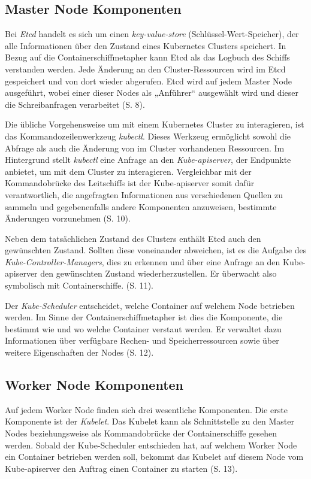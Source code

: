 \documentclass[11pt,a4paper]{article}
\begin{document}
\subsection{Master Node Komponenten}
\label{sec:MasterNodeKomponenten}
Bei \emph{Etcd} handelt es sich um einen \emph{key-value-store} (Schlüssel-Wert-Speicher),
der alle Informationen über den Zustand eines Kubernetes Clusters speichert.
In Bezug auf die Containerschiffmetapher kann Etcd als das Logbuch des Schiffs verstanden werden.
Jede Änderung an den Cluster-Ressourcen wird im Etcd gespeichert und von dort wieder abgerufen.
Etcd wird auf jedem Master Node ausgeführt, wobei einer dieser Nodes als „Anführer“
ausgewählt wird und dieser die Schreibanfragen verarbeitet \cite{Schmeling_Dargatz_2022} (S. 8).

Die übliche Vorgehensweise um mit einem Kubernetes Cluster zu interagieren, ist das Kommandozeilenwerkzeug \emph{kubectl}.
Dieses Werkzeug ermöglicht sowohl die Abfrage als auch die Änderung von im Cluster vorhandenen Ressourcen.
Im Hintergrund stellt \emph{kubectl} eine Anfrage an den \emph{Kube-apiserver}, der Endpunkte anbietet,
um mit dem Cluster zu interagieren. Vergleichbar mit der Kommandobrücke des Leitschiffs ist der Kube-apiserver
somit dafür verantwortlich, die angefragten Informationen
aus verschiedenen Quellen zu sammeln und gegebenenfalls andere Komponenten anzuweisen, bestimmte Änderungen vorzunehmen \cite{Schmeling_Dargatz_2022} (S. 10).

Neben dem tatsächlichen Zustand des Clusters enthält Etcd auch den gewünschten Zustand.
Sollten diese voneinander abweichen, ist es die Aufgabe des \emph{Kube-Controller-Managers},
dies zu erkennen und über eine Anfrage an den Kube-apiserver den gewünschten Zustand wiederherzustellen.
Er überwacht also symbolisch mit Containerschiffe. \cite{Schmeling_Dargatz_2022} (S. 11).

Der \emph{Kube-Scheduler} entscheidet, welche Container auf welchem Node betrieben werden.
Im Sinne der Containerschiffmetapher ist dies die Komponente, die bestimmt
wie und wo welche Container verstaut werden.
Er verwaltet dazu Informationen über verfügbare Rechen- und Speicherressourcen sowie über weitere Eigenschaften
der Nodes \cite{Schmeling_Dargatz_2022} (S. 12).

\subsection{Worker Node Komponenten}
\label{sec:WorkerNodeKomponenten}
Auf jedem Worker Node finden sich drei wesentliche Komponenten.
Die erste Komponente ist der \emph{Kubelet}. Das Kubelet kann als Schnittstelle
zu den Master Nodes beziehungsweise als Kommandobrücke der Containerschiffe gesehen werden.
Sobald der Kube-Scheduler entschieden hat, auf welchem
Worker Node ein Container betrieben werden soll, bekommt das Kubelet auf diesem Node
vom Kube-apiserver den Auftrag einen Container zu starten \cite{Schmeling_Dargatz_2022} (S. 13).
\end{document}

